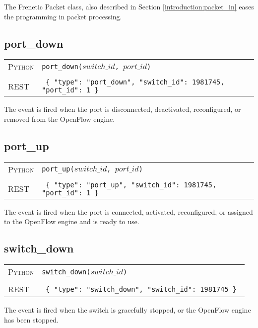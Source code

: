 The Frenetic Packet class, also described in Section \ref{introduction:packet_in} eases the programming
in packet processing.

\subsection{port\_down}

\bigskip
\begin{tabularx}{\linewidth}{lX}
\textsc{Python}   & \texttt{port\_down($switch\_id$, $port\_id$)} \\ \\
\textsc{REST} & \texttt{ \{ "type": "port\_down", "switch\_id": 1981745, "port\_id": 1 \} } 
\end{tabularx}

The  event is fired when the port is disconnected, deactivated, reconfigured, or
removed from the OpenFlow engine.  
 
\subsection{port\_up}

\bigskip
\begin{tabularx}{\linewidth}{lX}
\textsc{Python}   & \texttt{port\_up($switch\_id$, $port\_id$)} \\ \\
\textsc{REST} & \texttt{ \{ "type": "port\_up", "switch\_id": 1981745, "port\_id": 1 \} } 
\end{tabularx}

The  event is fired when the port is connected, activated, reconfigured, or
assigned to the OpenFlow engine and is ready to use.  

\subsection{switch\_down}

\bigskip
\begin{tabularx}{\linewidth}{lX}
\textsc{Python}   & \texttt{switch\_down($switch\_id$)} \\ \\
\textsc{REST} & \texttt{ \{ "type": "switch\_down", "switch\_id": 1981745 \} } 
\end{tabularx}

The  event is fired when the switch is gracefully stopped, or the OpenFlow
engine has been stopped.  
 
